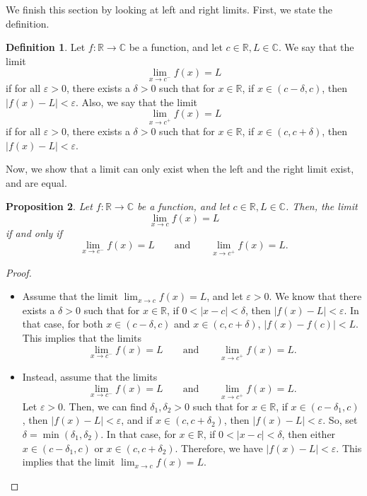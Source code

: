 \documentclass[a4paper, openany]{memoir}
\theoremstyle{definition}
\newtheorem{definition}{Definition}[section]
\theoremstyle{plain}
\newtheorem{proposition}[definition]{Proposition}
\begin{document}
We finish this section by looking at left and right limits. First, we state the definition.
\begin{definition}
Let $f: \mathbb{R} \to \mathbb{C}$ be a function, and let $c \in \mathbb{R}, L \in \mathbb{C}$. We say that the limit
\[\lim_{x \to c^-} f(x) = L\]
if for all $\varepsilon > 0$, there exists a $\delta > 0$ such that for $x \in \mathbb{R}$, if $x \in (c - \delta, c)$, then $|f(x) - L| < \varepsilon$. Also, we say that the limit
\[\lim_{x \to c^+} f(x) = L\]
if for all $\varepsilon > 0$, there exists a $\delta > 0$ such that for $x \in \mathbb{R}$, if $x \in (c, c + \delta)$, then $|f(x) - L| < \varepsilon$.
\end{definition}
\noindent Now, we show that a limit can only exist when the left and the right limit exist, and are equal.
\begin{proposition}
Let $f: \mathbb{R} \to \mathbb{C}$ be a function, and let $c \in \mathbb{R}, L \in \mathbb{C}$. Then, the limit
\[\lim_{x \to c} f(x) = L\]
if and only if
\[\lim_{x \to c^-} f(x) = L \qquad \text{and} \qquad \lim_{x \to c^+} f(x) = L.\]
\end{proposition}
\begin{proof}
\hspace*{0pt}
\begin{itemize}
    \item Assume that the limit $\lim_{x \to c} f(x) = L$, and let $\varepsilon > 0$. We know that there exists a $\delta > 0$ such that for $x \in \mathbb{R}$, if $0 < |x - c| < \delta$, then $|f(x) - L| < \varepsilon$. In that case, for both $x \in (c - \delta, c)$ and $x \in (c, c + \delta)$, $|f(x) - f(c)| < L$. This implies that the limits
    \[\lim_{x \to c^-} f(x) = L \qquad \text{and} \qquad \lim_{x \to c^+} f(x) = L.\]
    
    \item Instead, assume that the limits
    \[\lim_{x \to c^-} f(x) = L \qquad \text{and} \qquad \lim_{x \to c^+} f(x) = L.\]
    Let $\varepsilon > 0$. Then, we can find $\delta_1, \delta_2 > 0$ such that for $x \in \mathbb{R}$, if $x \in (c - \delta_1, c)$, then $|f(x) - L| < \varepsilon$, and if $x \in (c, c + \delta_2)$, then $|f(x) - L| < \varepsilon$. So, set $\delta = \min(\delta_1, \delta_2)$. In that case, for $x \in \mathbb{R}$, if $0 < |x - c| < \delta$, then either $x \in (c - \delta_1, c)$ or $x \in (c, c + \delta_2)$. Therefore, we have $|f(x) - L| < \varepsilon$. This implies that the limit $\lim_{x \to c} f(x) = L$.
\end{itemize}
\end{proof}
\end{document}
